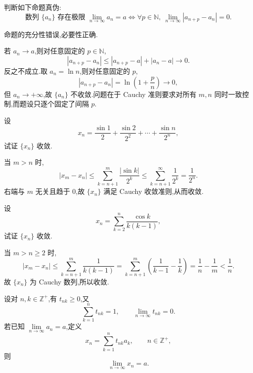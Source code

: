 \begin{example}
  判断如下命题真伪:
  \[
    \text{数列 }\{a_n\}\text{ 存在极限 }\lim\limits_{n\to\infty}a_n=a
    \iff
    \forall p\in\mathbb N,\ \lim\limits_{n\to\infty}|a_{n+p}-a_n|=0.
  \]
\end{example}
\exampleblank

\begin{solution}
  命题的充分性错误,必要性正确.

  若 $a_n\to a$,则对任意固定的 $p\in\mathbb N$,
  \[
    |a_{n+p}-a_n|
    \leq|a_{n+p}-a|+|a_n-a|\longrightarrow0.
  \]
  反之不成立.取 $a_n=\ln n$,则对任意固定的 $p$,
  \[
    |a_{n+p}-a_n|=\ln\left(1+\dfrac{p}{n}\right)\longrightarrow0,
  \]
  但 $a_n\to+\infty$,故 $\{a_n\}$ 不收敛.问题在于 Cauchy 准则要求对所有
  $m,n$ 同时一致控制,而题设只逐个固定了间隔 $p$.
\end{solution}

\begin{example}
  设
  \[
    x_n=\dfrac{\sin1}{2}+\dfrac{\sin2}{2^2}+\cdots+\dfrac{\sin n}{2^n},
  \]
  试证 $\{x_n\}$ 收敛.
\end{example}
\exampleblank

\begin{solution}
  当 $m>n$ 时,
  \[
    |x_m-x_n|
    \leq\sum\limits_{k=n+1}^m\dfrac{|\sin k|}{2^k}
    \leq\sum\limits_{k=n+1}^{\infty}\dfrac{1}{2^k}
    =\dfrac{1}{2^n}.
  \]
  右端与 $m$ 无关且趋于 $0$,故 $\{x_n\}$ 满足 Cauchy 收敛准则,从而收敛.
\end{solution}

\begin{example}
  设
  \[
    x_n=\sum\limits_{k=2}^n\dfrac{\cos k}{k(k-1)},
  \]
  试证 $\{x_n\}$ 收敛.
\end{example}
\exampleblank

\begin{solution}
  当 $m>n\geq2$ 时,
  \[
    |x_m-x_n|
    \leq\sum\limits_{k=n+1}^m\dfrac{1}{k(k-1)}
    =\sum\limits_{k=n+1}^m\left(\dfrac{1}{k-1}-\dfrac{1}{k}\right)
    =\dfrac{1}{n}-\dfrac{1}{m}<\dfrac{1}{n}.
  \]
  故 $\{x_n\}$ 为 Cauchy 数列,所以收敛.
\end{solution}




\begin{theorem}
  设对 $n,k\in\mathbb Z^+$,有 $t_{nk}\geq0$,又
  \[
    \sum\limits_{k=1}^n t_{nk}=1,
    \qquad
    \lim\limits_{n\to\infty}t_{nk}=0.
  \]
  若已知 $\displaystyle \lim\limits_{n\to\infty}a_n=a$,定义
  \[
    x_n=\sum\limits_{k=1}^n t_{nk}a_k,\qquad n\in\mathbb Z^+,
  \]
  则
  \[
    \lim\limits_{n\to\infty}x_n=a.
  \]
\end{theorem}

